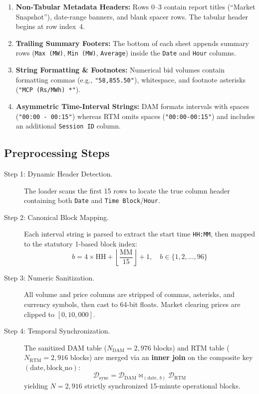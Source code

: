 \documentclass[12pt, a4paper]{article}
\theoremstyle{definition}
\newcommand{\dam}{\text{DAM}}
\newcommand{\rtm}{\text{RTM}}
\begin{document}
\begin{enumerate}[label=\textbf{(\arabic*)}]
    \item \textbf{Non-Tabular Metadata Headers:} Rows 0--3 contain report titles (``Market Snapshot''), date-range banners, and blank spacer rows. The tabular header begins at row index~4.
    \item \textbf{Trailing Summary Footers:} The bottom of each sheet appends summary rows (\texttt{Max (MW)}, \texttt{Min (MW)}, \texttt{Average}) inside the \texttt{Date} and \texttt{Hour} columns.
    \item \textbf{String Formatting \& Footnotes:} Numerical bid volumes contain formatting commas (e.g., \texttt{"58,855.50"}), whitespace, and footnote asterisks (\texttt{"MCP (Rs/MWh) *"}).
    \item \textbf{Asymmetric Time-Interval Strings:} DAM formats intervals with spaces (\texttt{"00:00 - 00:15"}) whereas RTM omits spaces (\texttt{"00:00-00:15"}) and includes an additional \texttt{Session ID} column.
\end{enumerate}

\subsection{Preprocessing Steps}

\begin{description}
    \item[Step 1: Dynamic Header Detection.] The loader scans the first 15 rows to locate the true column header containing both \texttt{Date} and \texttt{Time Block}/\texttt{Hour}.
    \item[Step 2: Canonical Block Mapping.] Each interval string is parsed to extract the start time \texttt{HH:MM}, then mapped to the statutory 1-based block index:
    \begin{equation}
        b = 4 \times \text{HH} + \left\lfloor \frac{\text{MM}}{15} \right\rfloor + 1, \quad b \in \{1, 2, \ldots, 96\}
    \end{equation}
    \item[Step 3: Numeric Sanitization.] All volume and price columns are stripped of commas, asterisks, and currency symbols, then cast to 64-bit floats. Market clearing prices are clipped to $[0, 10{,}000]$.
    \item[Step 4: Temporal Synchronization.] The sanitized DAM table ($N_{\dam} = 2{,}976$ blocks) and RTM table ($N_{\rtm} = 2{,}916$ blocks) are merged via an \textbf{inner join} on the composite key $(\text{date}, \text{block\_no})$:
    \begin{equation}
        \mathcal{D}_{\text{sync}} = \mathcal{D}_{\dam} \bowtie_{(\text{date}, \, b)} \mathcal{D}_{\rtm}
    \end{equation}
    yielding $N = 2{,}916$ strictly synchronized 15-minute operational blocks.
\end{description}
\end{document}
